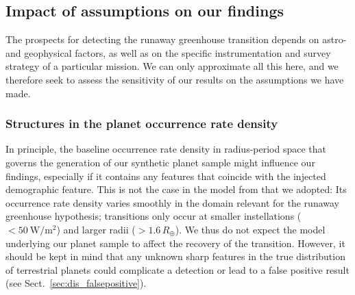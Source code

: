 \documentclass[twocolumn,twocolappendix]{aastex631}
\begin{document}
\subsection{Impact of assumptions on our findings}
The prospects for detecting the runaway greenhouse transition depends on astro- and geophysical factors, as well as on the specific instrumentation and survey strategy of a particular mission.
We can only approximate all this here, and we therefore seek to assess the sensitivity of our results on the assumptions we have made.

\subsubsection{Structures in the planet occurrence rate density}
In principle, the baseline occurrence rate density in radius-period space that governs the generation of our synthetic planet sample might influence our findings, especially if it contains any features that coincide with the injected demographic feature.
This is not the case in the model from \citet{Bergsten2022} that we adopted: Its occurrence rate density varies smoothly in the domain relevant for the runaway greenhouse hypothesis; transitions only occur at smaller instellations ($< \SI{50}{\watt\per\meter\squared}$) and larger radii ($> 1.6\,R_\oplus$).
We thus do not expect the model underlying our planet sample to affect the recovery of the transition.
However, it should be kept in mind that any unknown sharp features in the true distribution of terrestrial planets could complicate a detection or lead to a false positive result (see Sect.~\ref{sec:dis_falsepositive}).
\end{document}
